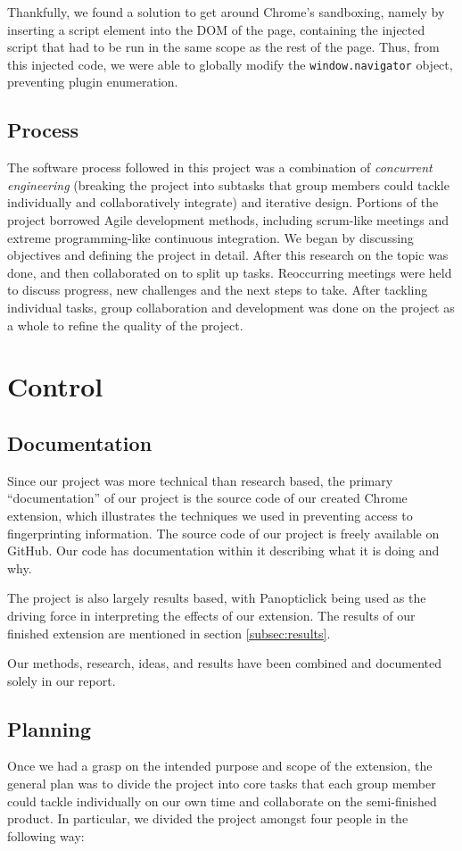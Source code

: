 \documentclass[12pt,a4paper]{article}
\begin{document}
Thankfully, we found a solution to get around Chrome's sandboxing, namely by inserting a script element into the DOM of the page, containing the injected script that had to be run in the same scope as the rest of the page. Thus, from this injected code, we were able to globally modify the \texttt{window.navigator} object, preventing plugin enumeration.

\subsection{Process}
The software process followed in this project was a combination of \textit{concurrent engineering} (breaking the project into subtasks that group members could tackle individually and collaboratively integrate) and iterative design. Portions of the project borrowed Agile development methods, including scrum-like meetings and extreme programming-like continuous integration. We began by discussing objectives and defining the project in detail. After this research on the topic was done, and then collaborated on to split up tasks. Reoccurring meetings were held to discuss progress, new challenges and the next steps to take. After tackling individual tasks, group collaboration and development was done on the project as a whole to refine the quality of the project.

\section{Control}
\subsection{Documentation}
Since our project was more technical than research based, the primary ``documentation'' of our project is the source code of our created Chrome extension, which illustrates the techniques we used in preventing access to fingerprinting information. The source code of our project is freely available on GitHub\cite{github}. Our code has documentation within it describing what it is doing and why.

The project is also largely results based, with Panopticlick being used as the driving force in interpreting the effects of our extension. The results of our finished extension are mentioned in section \ref{subsec:results}.

Our methods, research, ideas, and results have been combined and documented solely in our report. 

\subsection{Planning}
Once we had a grasp on the intended purpose and scope of the extension, the general plan was to divide the project into core tasks that each group member could tackle individually on our own time and collaborate on the semi-finished product. In particular, we divided the project amongst four people in the following way:
\end{document}
